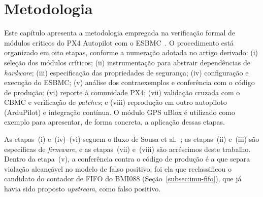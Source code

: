 \chapter{Metodologia}
\label{cap:metodologia}


Este capítulo apresenta a metodologia empregada na verificação formal de módulos críticos do PX4 Autopilot com o ESBMC~\cite{Menezes2024}. O procedimento está organizado em oito etapas, conforme a numeração adotada no artigo derivado: (i) seleção dos módulos críticos; (ii) instrumentação para abstrair dependências de \textit{hardware}; (iii) especificação das propriedades de segurança; (iv) configuração e execução do ESBMC; (v) análise dos contraexemplos e conferência com o código de produção; (vi) reporte à comunidade PX4; (vii) validação cruzada com o CBMC e verificação de \textit{patches}; e (viii) reprodução em outro autopiloto (ArduPilot) e integração contínua. O módulo GPS uBlox é utilizado como exemplo para apresentar, de forma concreta, a aplicação dessas etapas.


As etapas~(i) e~(iv)--(vi) seguem o fluxo de Sousa et
al.~\cite{Sousa2026}; as etapas~(ii) e~(iii) são específicas de \textit{firmware},
e as etapas~(vii) e~(viii) são acréscimos deste trabalho. Dentro da etapa~(v), a
conferência contra o código de produção é a que separa violação alcançável no
modelo de falso positivo: foi ela que reclassificou o candidato do contador de
FIFO do BMI088 (Seção~\ref{subsec:imu-fifo}), que já havia sido proposto
\textit{upstream}, como falso positivo.


